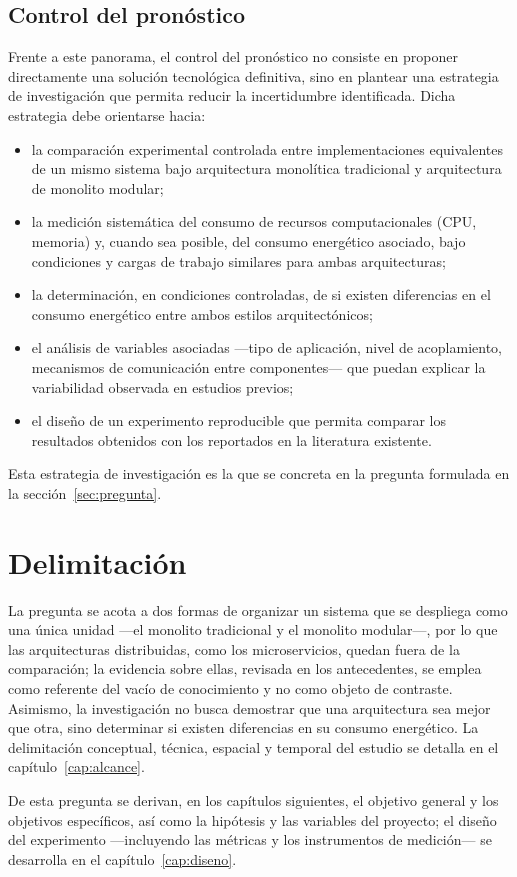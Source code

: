 \subsection{Control del pronóstico}
\label{sec:control}

Frente a este panorama, el control del pronóstico no consiste en proponer directamente una solución tecnológica definitiva, sino en plantear una estrategia de investigación que permita reducir la incertidumbre identificada. Dicha estrategia debe orientarse hacia:
\begin{itemize}
  \item la comparación experimental controlada entre implementaciones equivalentes de un mismo sistema bajo arquitectura monolítica tradicional y arquitectura de monolito modular;
  \item la medición sistemática del consumo de recursos computacionales (CPU, memoria) y, cuando sea posible, del consumo energético asociado, bajo condiciones y cargas de trabajo similares para ambas arquitecturas;
  \item la determinación, en condiciones controladas, de si existen diferencias en el consumo energético entre ambos estilos arquitectónicos;
  \item el análisis de variables asociadas ---tipo de aplicación, nivel de acoplamiento, mecanismos de comunicación entre componentes--- que puedan explicar la variabilidad observada en estudios previos;
  \item el diseño de un experimento reproducible que permita comparar los resultados obtenidos con los reportados en la literatura existente.
\end{itemize}

Esta estrategia de investigación es la que se concreta en la pregunta formulada en la sección~\ref{sec:pregunta}.

\section{Delimitación}
\label{sec:delimitacion}

La pregunta se acota a dos formas de organizar un sistema que se despliega como una única unidad ---el monolito tradicional y el monolito modular---, por lo que las arquitecturas distribuidas, como los microservicios, quedan fuera de la comparación; la evidencia sobre ellas, revisada en los antecedentes, se emplea como referente del vacío de conocimiento y no como objeto de contraste. Asimismo, la investigación no busca demostrar que una arquitectura sea mejor que otra, sino determinar si existen diferencias en su consumo energético. La delimitación conceptual, técnica, espacial y temporal del estudio se detalla en el capítulo~\ref{cap:alcance}.

De esta pregunta se derivan, en los capítulos siguientes, el objetivo general y los objetivos específicos, así como la hipótesis y las variables del proyecto; el diseño del experimento ---incluyendo las métricas y los instrumentos de medición--- se desarrolla en el capítulo~\ref{cap:diseno}.